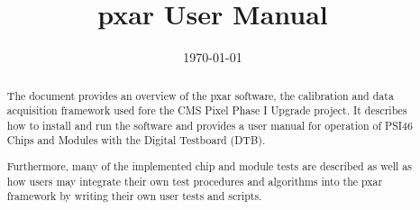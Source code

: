 \documentclass{scrartcl}
\title{pxar User Manual} %
\author{
} %
\date{\today} %
\begin{document}
\maketitle %


\begin{abstract}
The document provides an overview of the pxar software, the calibration and data acquisition framework used fore the CMS Pixel Phase I Upgrade project. It describes how to install and run the software and provides a user manual for operation of
PSI46 Chips and Modules with the Digital Testboard (DTB).

Furthermore, many of the implemented chip and module tests are described as well as how users may integrate their own test procedures and algorithms into the pxar framework by writing their own user tests and scripts.
\end{abstract}

\newpage
\tableofcontents

\newpage


\newpage

\newpage

\newpage

\newpage

\newpage

\newpage


\newpage
\printglossaries

\newpage
\clearpage
{}
\begin{thebibliography}{99}
  
\end{thebibliography}  
\end{document}
